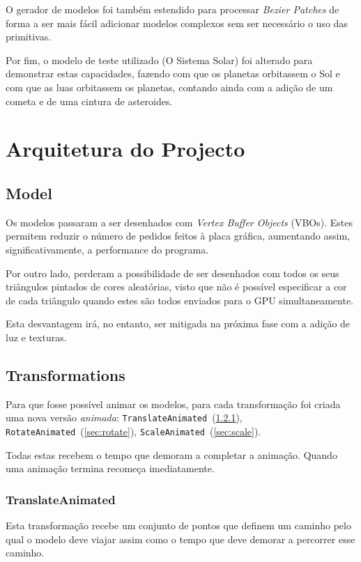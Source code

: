\documentclass[a4paper]{article}
\begin{document}
O gerador de modelos foi também estendido para processar \textit{Bezier Patches} de forma a ser mais fácil adicionar modelos complexos sem ser necessário o uso das primitivas.

Por fim, o modelo de teste utilizado (O Sistema Solar) foi alterado para demonstrar estas capacidades, fazendo com que os planetas orbitassem o Sol e com que as luas orbitassem os planetas, contando ainda com a adição de um cometa e de uma cintura de asteroides.

\section{Arquitetura do Projecto}

\subsection{Model}\label{sec:models}

Os modelos passaram a ser desenhados com \textit{Vertex Buffer Objects} (VBOs). Estes permitem reduzir o número de pedidos feitos à placa gráfica, aumentando assim, significativamente, a performance do programa.

Por outro lado, perderam a possibilidade de ser desenhados com todos os seus triângulos pintados de cores aleatórias, visto que não é possível especificar a cor de cada triângulo quando estes são todos enviados para o GPU simultaneamente.

Esta desvantagem irá, no entanto, ser mitigada na próxima fase com a adição de luz e texturas.

\subsection{Transformations}

Para que fosse possível animar os modelos, para cada transformação foi criada uma nova versão \textit{animada}: \texttt{TranslateAnimated}~(\ref{sec:translate}), \texttt{RotateAnimated}~(\ref{sec:rotate}), \texttt{ScaleAnimated}~(\ref{sec:scale}).

Todas estas recebem o tempo que demoram a completar a animação. Quando uma animação termina recomeça imediatamente.

\subsubsection{TranslateAnimated}\label{sec:translate}

Esta transformação recebe um conjunto de pontos que definem um caminho pelo qual o modelo deve viajar assim como o tempo que deve demorar a percorrer esse caminho.
\end{document}
